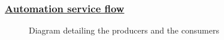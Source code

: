 \newpage

\subsubsection*{\underline{Automation service flow}}
\begin{figure}[H]
	\centering
	\caption{Diagram detailing the producers and the consumers}
	\label{fig:send-invite-sequence-diagram}
\end{figure}

